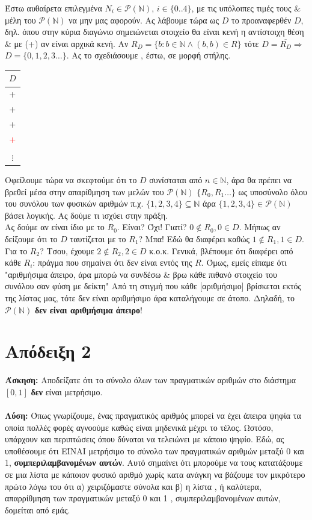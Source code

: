 \documentclass[]{article}
\begin{document}
Έστω αυθαίρετα επιλεγμένα $N_i \in \mathcal{P}(\mathbb{N})$, $i \in \{0..4\}$, με τις υπόλοιπες τιμές τους \& μέλη του $\mathcal{P}(\mathbb{N})$ να μην μας αφορούν.
Ας λάβουμε τώρα ως $D$ το προαναφερθέν $D$, δηλ. όπου στην κύρια διαγώνιο σημειώνεται στοιχείο θα είναι κενή η αντίστοιχη θέση \& με (+) αν είναι αρχικά κενή.
Αν $R_D = \{b : b \in \mathbb{N} \land (b,b) \in R\}$ τότε $D = \overline{R_D} \Rightarrow$
$ D = \{0, 1, 2, 3 \dots\}$. Ας το σχεδιάσουμε , έστω, σε μορφή στήλης.
\begin{center}
	\begin{tabular}{c}
		$D$ \\ \hline
		+ \\ \hline
		+ \\ \hline
		+ \\ \hline
		\textcolor{red}{+} \\ \hline
		\\ \hline
		$\vdots$
	\end{tabular}
\end{center}
Οφείλουμε τώρα να σκεφτούμε ότι το $D$ συνίσταται από $n \in \mathbb{N}$, άρα θα πρέπει να βρεθεί μέσα στην απαρίθμηση των μελών του $\mathcal{P}(\mathbb{N})$ $\{R_0, R_1 \dots\}$ ως υποσύνολο όλου του συνόλου των φυσικών αριθμών π.χ. $\{1, 2, 3, 4\} \subseteq \mathbb{N}$ άρα $\{1, 2, 3, 4\} \in \mathcal{P}(\mathbb{N})$ βάσει λογικής. Ας δούμε τι ισχύει στην πράξη. \\


	 Ας δούμε αν είναι ίδιο με το $R_0$. Είναι? Όχι! Γιατί? $0 \notin R_0, 0 \in D$. 
	 Μήπως αν δείξουμε ότι το $D$ ταυτίζεται με το $R_1$? Μπα! Εδώ θα διαφέρει καθώς $1 \notin R_1, 1 \in D$. Για το $R_2$? Τσου, έχουμε $2 \notin R_2, 2 \in D$ κ.ο.κ.
	 Γενικά, βλέπουμε ότι διαφέρει από κάθε $R_i$: πράγμα που σημαίνει ότι δεν είναι εντός της $R$.
	 Όμως, εμείς είπαμε ότι "αριθμήσιμα άπειρο, άρα μπορώ να συνδέσω \& βρω κάθε πιθανό στοιχείο του συνόλου σαν φύση με δείκτη"
	 Από τη στιγμή που κάθε [αριθμήσιμο] βρίσκεται εκτός της λίστας μας, τότε δεν είναι αριθμήσιμο άρα καταλήγουμε σε άτοπο. Δηλαδή, το $\mathcal{P}(\mathbb{N})$ \textbf{δεν είναι αριθμήσιμα άπειρο}!

\section{Απόδειξη 2}
\textbf{Άσκηση:} Αποδείξατε ότι το σύνολο όλων των πραγματικών αριθμών στο διάστημα $[0,1]$ \textbf{δεν} είναι μετρήσιμο.
\\~\\
\textbf{Λύση:}
Όπως γνωρίζουμε, ένας πραγματικός αριθμός μπορεί να έχει άπειρα ψηφία τα οποία πολλές φορές αγνοούμε καθώς είναι μηδενικά μέχρι το τέλος. Ωστόσο, υπάρχουν και περιπτώσεις όπου δύναται να τελειώνει με κάποιο ψηφίο.
Εδώ, ας υποθέσουμε ότι ΕΊΝΑΙ μετρήσιμο το σύνολο των πραγματικών αριθμών μεταξύ 0 και 1, \textbf{συμπεριλαμβανομένων αυτών}. Αυτό σημαίνει ότι μπορούμε να τους κατατάξουμε σε μια λίστα με κάποιον φυσικό αριθμό χωρίς κατα ανάγκη να βάζουμε τον μικρότερο πρώτο λόγω του ότι α) χειριζόμαστε σύνολα και β) η λίστα , ή καλύτερα, απαρρίθμηση των πραγματικών μεταξύ 0 και 1 , συμπεριλαμβανομένων αυτών, δομείται από εμάς.
\end{document}

